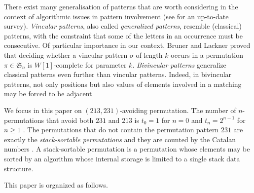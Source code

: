 \documentclass[a4paper]{llncs}
\newcommand{\ptext}{\pi}
\newcommand{\pmotif}{\sigma}
\newcounter{num}
\begin{document}
	There exist many generalisation of patterns that are worth considering
	in the context of algorithmic issues in pattern involvement
	(see \cite{Kitaev:book:2011} for an up-to-date survey).
	\emph{Vincular patterns}, also called 
	\emph{generalized patterns},
	resemble (classical) patterns, with the constraint that some of the letters in
	an occurrence must be consecutive.
	Of particular importance in our context,
	Bruner and Lackner \cite{Bruner:Lackner:SWAT:2012}
	proved that deciding whether a vincular pattern
	$\sigma$ of length $k$ occurs in a permutation
	$\pi \in \mathfrak{S}_n$ is $W[1]$-complete for
	parameter $k$.
	\emph{Bivincular patterns} generalize classical patterns even further 
	than vincular
	patterns. Indeed, in bivincular patterns,
	not only positions but also values
	of elements involved in a matching may be forced to be adjacent

	We focus in this paper on $(213,231)$-avoiding permutation. 
	The number of $n$-permutations that avoid both 
	$231$ and $213$ is 
	$t_0 = 1$ for $n = 0$ and 
	$t_n =2^{n−1}$ for $n\geq 1$ \cite{Simion:Schmidt:EJC:1985}.
	The permutations that do not contain the permutation pattern $231$
	are exactly the \emph{stack-sortable permutations} and they are counted by 
	the Catalan numbers \cite{Knuth:1997:ACP:260999}.
	A stack-sortable permutation is a permutation whose elements may be sorted by 
	an algorithm whose internal storage is limited to a single stack data structure.

	This paper is organized as follows.
	
%	 
%
%	
	
\end{document}

